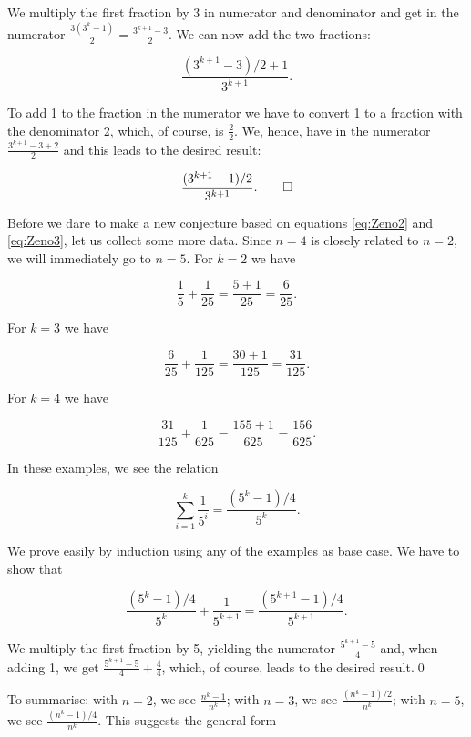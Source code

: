 \documentclass[tikz]{scrreprt}
\begin{document}
We multiply the first fraction by 3 in numerator and
denominator and get in the numerator
$\frac{3(3^k - 1)}{2} = \frac{3^{k+1} - 3}{2}$. 
We can now add the two fractions:

\[
\frac{(3^{k+1} - 3) / 2 + 1}{3^{k+1}}.
\]

To add 1 to the fraction in the numerator
we have to convert 1 to a fraction with the denominator 2,
which, of course, is $\frac{2}{2}$.
We, hence, have in the numerator
$\frac{3^{k+1} - 3 + 2}{2}$
and this leads to the desired result:

\begin{equation}
\frac{(3^{k+1} - 1) / 2}{3^{k+1}}.\qed
\end{equation}

Before we dare to make a new conjecture
based on equations \ref{eq:Zeno2} and \ref{eq:Zeno3},
let us collect some more data.
Since $n=4$ is closely related to $n=2$,
we will immediately go to $n=5$.
For $k=2$ we have

\[
\frac{1}{5} + \frac{1}{25} =
\frac{5 + 1}{25} = \frac{6}{25}.
\]

For $k=3$ we have

\[
\frac{6}{25} + \frac{1}{125} =
\frac{30+1}{125} = \frac{31}{125}.
\]

For $k=4$ we have

\[
\frac{31}{125} + \frac{1}{625} =
\frac{155+1}{625} = \frac{156}{625}.
\]

In these examples, we see the relation 

\begin{equation}\label{eq:Zeno5}
\sum_{i=1}^k{\frac{1}{5^i}} = 
\frac{(5^k - 1)/ 4}{5^k}.
\end{equation}

We prove easily by induction using any
of the examples as base case.
We have to show that

\begin{equation} 
\frac{(5^k - 1)/4}{5^k} + \frac{1}{5^{k+1}} =
\frac{(5^{k+1} - 1)/4}{5^{k+1}}.
\end{equation} 

We multiply the first fraction by 5, yielding the numerator
$\frac{5^{k+1} - 5}{4}$ and, when adding 1, we get
$\frac{5^{k+1} - 5}{4} + \frac{4}{4}$, which, of course,
leads to the desired result.\qed

To summarise:
with $n=2$, we see $\frac{n^k - 1}{n^k}$;
with $n=3$, we see $\frac{(n^k - 1)/2}{n^k}$;
with $n=5$, we see $\frac{(n^k - 1)/4}{n^k}$.
This suggests the general form
\end{document}
